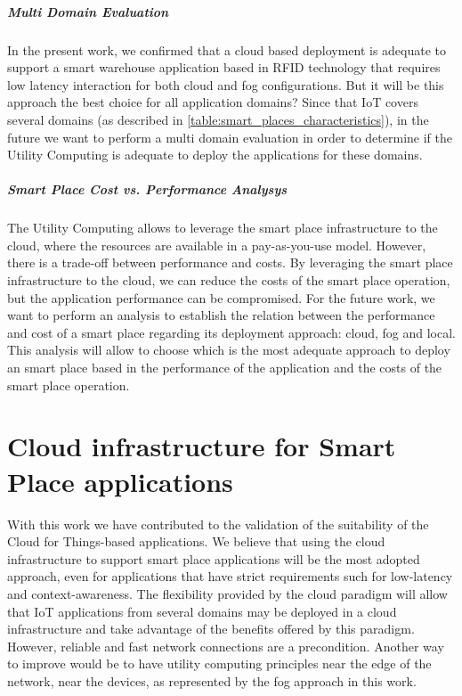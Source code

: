 \subparagraph{Multi Domain Evaluation}
\label{subp:multi_domain_evaluation}
In the present work, we confirmed that a cloud based deployment is adequate to support a smart
warehouse application based in RFID technology that requires low latency interaction for both cloud
and fog configurations. But it will be this approach the best choice for all application domains?
Since that IoT covers several domains (as described in \ref{table:smart_places_characteristics}), in
the future we want to perform a multi domain evaluation in order to determine if the Utility
Computing is adequate to deploy the applications for these domains.

\subparagraph{Smart Place Cost vs. Performance Analysys}
\label{subp:cost_analysys}
The Utility Computing allows to leverage the smart place infrastructure to the cloud,
where the resources are available in a pay-as-you-use model. However, there is a
trade-off between performance and costs. By leveraging the smart place infrastructure
to the cloud, we can reduce the costs of the smart place operation, but the
application performance can be compromised. For the future work, we want to perform
an analysis to establish the relation between the performance and cost of a smart place
regarding its deployment approach: cloud, fog and local. This analysis will allow
to choose which is the most adequate approach to deploy an smart place based in
the performance of the application and the costs of the smart place operation.

\section{Cloud infrastructure for Smart Place applications}
\label{sec:conclusion_summary}
With this work we have contributed to the validation of the suitability of the Cloud for Things-based
applications. We believe that using the cloud infrastructure to support smart place applications will be the
most adopted approach, even for applications that have strict requirements such for low-latency
and context-awareness. The flexibility provided by the cloud paradigm will allow that
\gls{IoT} applications from several domains may be deployed in a cloud infrastructure and take
advantage of the benefits offered by this paradigm. However, reliable and fast network connections
are a precondition. Another way to improve would be to have utility computing principles near the
edge of the network, near the devices, as represented by the fog approach in this work.
